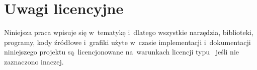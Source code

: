 \documentclass[thesis]{subfiles}
\begin{document}

\section{Uwagi licencyjne}

Niniejsza praca wpisuje się w~tematykę  i~dlatego wszystkie narzędzia, biblioteki, programy, kody źródłowe i~grafiki użyte w~czasie implementacji i~dokumentacji niniejszego projektu są~licencjonowane na~warunkach licencji typu~ jeśli nie zaznaczono inaczej.

%
\end{document}
